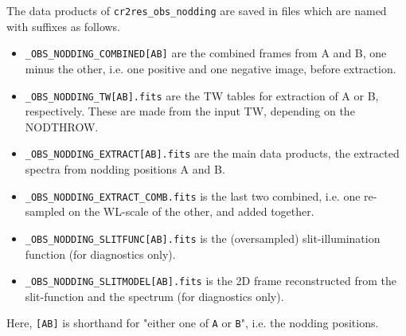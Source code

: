 The data products of \texttt{cr2res\_obs\_nodding} are saved in files which are
named with suffixes as follows.
\begin{itemize}
    \item \verb!_OBS_NODDING_COMBINED[AB]! are the combined frames from A and B, one minus the other, i.e. one positive and one negative image, before extraction.
    \item \verb!_OBS_NODDING_TW[AB].fits! are the TW tables for extraction of A or B, respectively. These are made from the input TW, depending on the NODTHROW.
    \item \verb!_OBS_NODDING_EXTRACT[AB].fits! are the main data products, the extracted spectra from nodding positions A and B.
    \item \verb!_OBS_NODDING_EXTRACT_COMB.fits! is the last two combined, i.e. one re-sampled on the WL-scale of the other, and added together.
    \item \verb!_OBS_NODDING_SLITFUNC[AB].fits! is the (oversampled) slit-illumination function (for diagnostics only).
    \item \verb!_OBS_NODDING_SLITMODEL[AB].fits! is the 2D frame reconstructed from the slit-function and the spectrum (for diagnostics only).

\end{itemize}

Here, \verb![AB]! is shorthand for "either one of \verb!A! or \verb!B!", i.e.
the nodding positions.